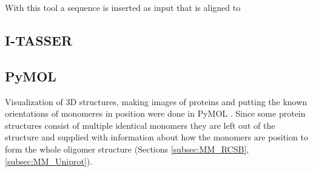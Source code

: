 With this tool a sequence is inserted as input that is aligned to 
 


\subsection{I-TASSER}
\label{subsec:MM_I_TASSER}

\subsection{PyMOL}
Visualization of 3D structures, making images of proteins and putting the known orientations of monomeres in position  were done in PyMOL \cite{}.
Since some protein structures consist of multiple identical monomers they are left out of the structure and supplied with information about how the monomers are position to form the whole oligomer structure (Sections \ref{subsec:MM_RCSB}, \ref{subsec:MM_Uniprot}).
\label{subsec:MM_PyMOL}

